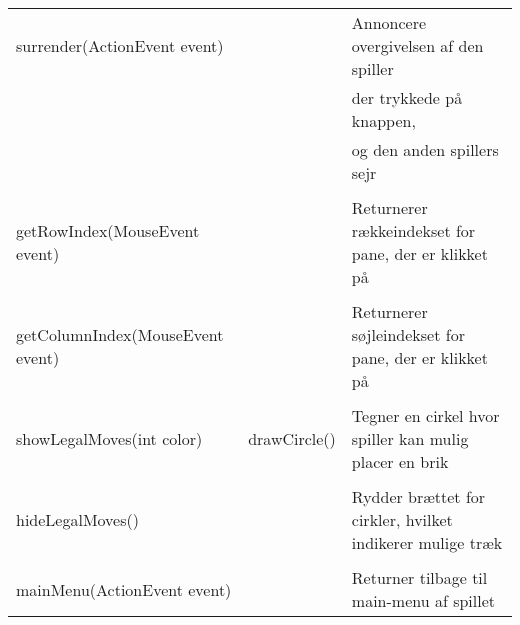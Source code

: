 \begin{table}[H]
\begin{tabular}{lll}
surrender(ActionEvent event) & & Annoncere overgivelsen af den spiller\\
& & der trykkede på knappen,\\
 & & og den anden spillers sejr\\
\\
getRowIndex(MouseEvent event)& & Returnerer rækkeindekset for pane, der er klikket på\\
\\
getColumnIndex(MouseEvent event)& & Returnerer søjleindekset for pane, der er klikket på\\
\\
showLegalMoves(int color) & drawCircle() & Tegner en cirkel hvor spiller kan mulig placer en brik\\
\\
hideLegalMoves() & & Rydder brættet for cirkler, hvilket indikerer mulige træk\\
\\
mainMenu(ActionEvent event) & & Returner tilbage til main-menu af spillet\\

\bottomrule
\end{tabular}
\end{table}
